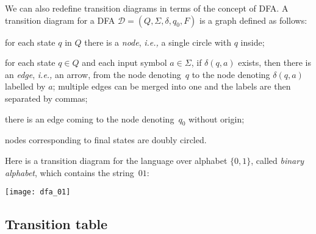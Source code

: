We can also redefine transition diagrams in terms of the concept of
DFA. A transition diagram for a DFA \(\mathcal{D} = (Q, \Sigma,
\delta, q_0, F)\) is a graph defined as follows:
\begin{enumerate*}

  \item for each state \(q\) in \(Q\) there is a \emph{node}, \emph{i.e.,} a
    single circle with \(q\) inside;

  \item for each state \(q \in Q\) and each input symbol \(a \in
    \Sigma\), if \(\delta (q, a)\) exists, then there is an
    \emph{edge}, \emph{i.e.,} an arrow, from the node denoting~\(q\) to the
    node denoting \(\delta (q, a)\) labelled by \(a\); multiple edges
    can be merged into one and the labels are then separated by
    commas;

  \item there is an edge coming to the node denoting~\(q_0\) without
    origin;

  \item nodes corresponding to final states are doubly circled.

\end{enumerate*}
Here is a transition diagram for the language over alphabet \(\{0,
1\}\), called \emph{binary alphabet}, which contains the
string~\(01\):
\begin{center}
\texttt{[image: dfa\_01]}
\end{center} 

\subsection*{Transition table}

